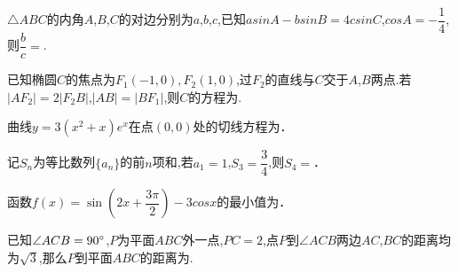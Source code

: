 \documentclass[windows,list]{BHCexam}
\begin{document}
\begin{groups}
\begin{questions}[]
\begin{minipage}{\linewidth}
\begin{solution}{4cm}
\end{solution}
\end{minipage}
\vfill
\begin{minipage}{\linewidth}
\question[5] $\triangle ABC$的内角$A$,$B$,$C$的对边分别为$a$,$b$,$c$,已知$asinA-bsinB=4csinC$,$cosA=- \dfrac {1}{4}$,则$ \dfrac {b}{c} =$.
\begin{solution}{4cm}

\end{solution}
\end{minipage}
\vfill
\begin{minipage}{\linewidth}
\question[5] 已知椭圆$C$的焦点为${F}_{1}( - 1,0),{F}_{2}(1,0)$,过$F _{2}$的直线与$C$交于$A$,$B$两点$.$若$|A{F}_{2}|=2|{F}_{2}B|$,$|AB|=|B{F}_{1}|$,则$C$的方程为.
\begin{solution}{4cm}

\end{solution}
\end{minipage}
\vfill
\end{questions}

\begin{questions}[]
\begin{minipage}{\linewidth}
\question[5]  曲线$y=3(x ^{2} +x)e ^{x}$在点$(0 , 0)$处的切线方程为．
\begin{solution}{4cm}

\end{solution}
\end{minipage}
\vfill
\begin{minipage}{\linewidth}
\question[5]  记$S _{n}$为等比数列$\{a _{n} \}$的前$n$项和,若$a _{1} =1$,$S _{3} = \dfrac{3}{4}$,则$S _{4} =$．
\begin{solution}{4cm}

\end{solution}
\end{minipage}
\vfill
\begin{minipage}{\linewidth}
\question[5]  函数$f(x)=\sin(2x+ \dfrac{3\pi}{2} )-3cosx$的最小值为．
\begin{solution}{4cm}

\end{solution}
\end{minipage}
\vfill
\begin{minipage}{\linewidth}
\question[5] 已知$ \angle ACB=90^{\small \circ}$,$P$为平面$ABC$外一点,$PC=2$,点$P$到$ \angle ACB$两边$AC$,$BC$的距离均为$\sqrt{3}$,那么$P$到平面$ABC$的距离为.
\begin{solution}{4cm}


\end{solution}
\end{minipage}
\end{questions}
\end{groups}
\end{document}
